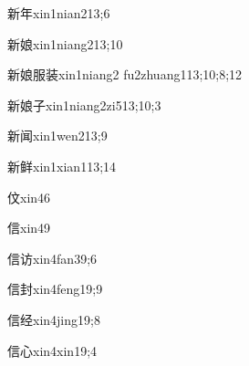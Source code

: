 \begin{verbete}{新年}{xin1nian2}{13;6}
\end{verbete}

\begin{verbete}{新娘}{xin1niang2}{13;10}
\end{verbete}

\begin{verbete}{新娘服装}{xin1niang2 fu2zhuang1}{13;10;8;12}
\end{verbete}

\begin{verbete}{新娘子}{xin1niang2zi5}{13;10;3}
\end{verbete}

\begin{verbete}{新闻}{xin1wen2}{13;9}
\end{verbete}

\begin{verbete}{新鲜}{xin1xian1}{13;14}
\end{verbete}

\begin{verbete}{伩}{xin4}{6}
\end{verbete}

\begin{verbete}{信}{xin4}{9}
\end{verbete}

\begin{verbete}{信访}{xin4fan3}{9;6}
\end{verbete}

\begin{verbete}{信封}{xin4feng1}{9;9}
\end{verbete}

\begin{verbete}{信经}{xin4jing1}{9;8}
\end{verbete}

\begin{verbete}{信心}{xin4xin1}{9;4}
\end{verbete}

